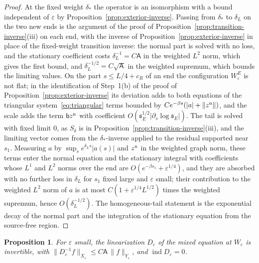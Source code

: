 \documentclass[11pt]{amsart}
\newtheorem{proposition}[theorem]{Proposition}
\theoremstyle{definition}
\theoremstyle{remark}
\theoremstyle{plain}
\numberwithin{equation}{section}
\newcommand{\ind}{\operatorname{ind}}
\newcommand{\eps}{\varepsilon}
\begin{document}
\begin{proof}
At the fixed weight $\delta_*$ the operator is an isomorphism with a bound independent
of $\eps$ by Proposition~\ref{prop:exterior-inverse}. Passing from $\delta_*$ to
$\delta_L$ on the two new ends is the argument of the proof of
Proposition~\ref{prop:transition-inverse}(iii) on each end, with the inverse of
Proposition~\ref{prop:exterior-inverse} in place of the fixed-weight transition
inverse: the normal part is solved with no loss, and the stationary coefficient costs
$\delta_L^{-1}=C\mathsf A$ in the weighted $L^2$ norm, which gives the first bound, and
$\delta_L^{-1/2}=C\sqrt{\mathsf A}$ in the weighted supremum, which bounds the limiting values.
On the part $s\le L/4+c_R$ of an end the configuration $W^E_\eps$ is not flat; in the
identification of Step~1(b) of the proof of Proposition~\ref{prop:exterior-inverse}
its deviation adds to both equations of the triangular system~\eqref{eq:triangular}
terms bounded by $Ce^{-\beta s}(|a|+\|z^{\rm n}\|)$, and the scale adds the term
$\mathsf b z^{\rm n}$ with coefficient $O({\mathfrak s}_E^{1/2}|\partial_s\log{\mathfrak s}_E|)$.
The tail is solved with fixed limit $0$, as $S_\delta$ is in
Proposition~\ref{prop:transition-inverse}(iii), and the limiting vector comes from
the $\delta_*$-inverse applied to the residual supported near $s_1$.
Measuring $a$ by $\sup_se^{\delta_Ls}|a(s)|$ and $z^{\rm n}$ in the weighted graph
norm, these terms enter the normal equation and the stationary integral with
coefficients whose $L^1$ and $L^2$ norms over the end are $O(e^{-\beta s_1}+\eps^{1/4})$,
and they are absorbed with no further loss in $\delta_L$ for $s_1$ fixed large and $\eps$
small; their contribution to the weighted $L^2$ norm of $a$ is at most
$C(1+\eps^{1/4}L^{1/2})$ times the weighted supremum, hence $O(\delta_L^{-1/2})$. The
homogeneous-tail statement is the exponential decay of the normal part and the
integration of the stationary equation from the source-free region.
\end{proof}

\begin{proposition}\label{prop:attachment-inverse}
For $\eps$ small, the linearization $D_\eps$ of the mixed equation at $W_\eps$
is invertible, with $\|D_\eps^{-1}f\|_{X_\eps}\le C\mathsf A\,\|f\|_{Y_\eps}$, and
$\ind D_\eps=0$.
\end{proposition}
\end{document}
